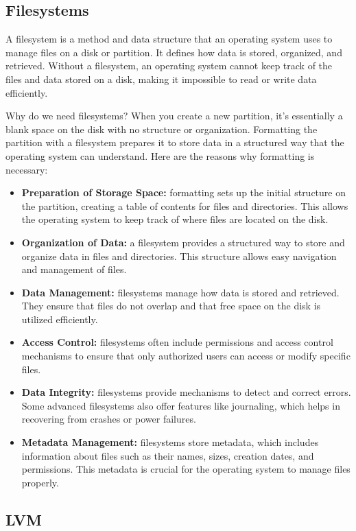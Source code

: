 \documentclass{article}
\begin{document}
\subsection{Filesystems}
A filesystem is a method and data structure that an operating system uses to manage files on a disk or partition. It defines how data is stored, organized, and retrieved. Without a filesystem, an operating system cannot keep track of the files and data stored on a disk, making it impossible to read or write data efficiently.

Why do we need filesystems? When you create a new partition, it's essentially a blank space on the disk with no structure or organization. Formatting the partition with a filesystem prepares it to store data in a structured way that the operating system can understand. Here are the reasons why formatting is necessary:

\begin{itemize}
    \item \textbf{Preparation of Storage Space:} formatting sets up the initial structure on the partition, creating a table of contents for files and directories. This allows the operating system to keep track of where files are located on the disk.
    \item \textbf{Organization of Data:} a filesystem provides a structured way to store and organize data in files and directories. This structure allows easy navigation and management of files.
    \item \textbf{Data Management:} filesystems manage how data is stored and retrieved. They ensure that files do not overlap and that free space on the disk is utilized efficiently.
    \item \textbf{Access Control:} filesystems often include permissions and access control mechanisms to ensure that only authorized users can access or modify specific files.
    \item \textbf{Data Integrity:} filesystems provide mechanisms to detect and correct errors. Some advanced filesystems also offer features like journaling, which helps in recovering from crashes or power failures.
    \item \textbf{Metadata Management:} filesystems store metadata, which includes information about files such as their names, sizes, creation dates, and permissions. This metadata is crucial for the operating system to manage files properly.
\end{itemize}

\subsection{LVM}
\end{document}
